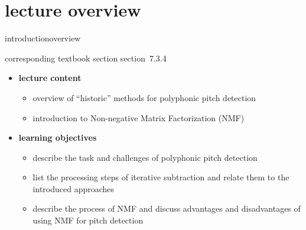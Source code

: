 


\subtitle{module 7.3.4: fundamental frequency detection in polyphonic signals}


	

    \section[overview]{lecture overview}
        \begin{frame}{introduction}{overview}
            \begin{block}{corresponding textbook section}
                    section~7.3.4
            \end{block}

            \begin{itemize}
                \item   \textbf{lecture content}
                    \begin{itemize}
                        \item   overview of ``historic'' methods for polyphonic pitch detection
                        \item   introduction to Non-negative Matrix Factorization (NMF)
                    \end{itemize}
                \bigskip
                \item<2->   \textbf{learning objectives}
                    \begin{itemize}
                        \item   describe the task and challenges of polyphonic pitch detection
                        \item   list the processing steps of iterative subtraction and relate them to the introduced approaches
                        \item   describe the process of NMF and discuss advantages and disadvantages of using NMF for pitch detection
                    \end{itemize}
            \end{itemize}
        \end{frame}

